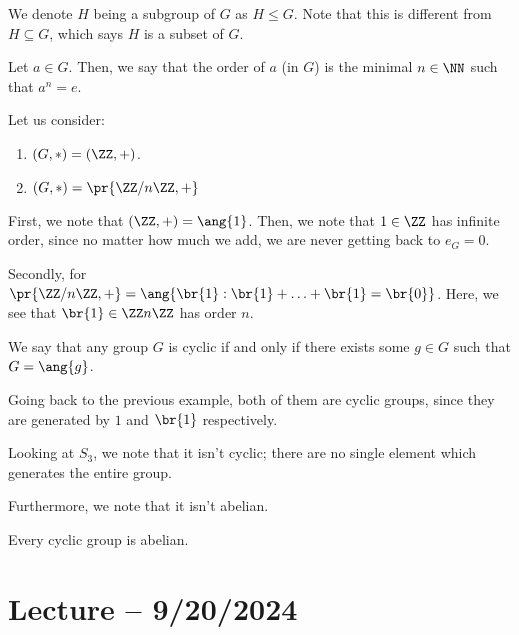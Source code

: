 \documentclass[openany]{book}
\begin{document}
\begin{rmk}
	We denote $H$ being a subgroup of $G$ as $H \leq G$. Note that this is different from $H \subseteq G$, which says $H$ is a subset of $G$.
\end{rmk}

\begin{defn}[Order]
	Let $a \in G$. Then, we say that the order of $a$ (in $G$) is the minimal $n \in \NN$ such that $a^{n} = e$.
\end{defn}

\begin{example}
	Let us consider:
	\begin{enumerate}
		\item $(G, *) = (\ZZ, +)$.
		\item $(G, *) = \pr{\ZZ/n\ZZ, +}$
	\end{enumerate}

	First, we note that $(\ZZ, +) = \ang{1}$. Then, we note that $1 \in \ZZ$ has infinite order, since no matter how much we add, we are never getting back to $e_G = 0$.
	
	Secondly, for $\pr{\ZZ/n\ZZ, +} = \ang{\br{1} : \br{1} + \ldots + \br{1} = \br{0}}$. Here, we see that $\br{1} \in \ZZ n\ZZ$ has order $n$.
\end{example}

\begin{defn}
	We say that any group $G$ is cyclic if and only if there exists some $g \in G$ such that $G = \ang{g}$.
\end{defn}
\begin{example}
	Going back to the previous example, both of them are cyclic groups, since they are generated by $1$ and $\br{1}$ respectively.
\end{example}
\begin{example}
	Looking at $S_3$, we note that it isn't cyclic; there are no single element which generates the entire group.
	
	Furthermore, we note that it isn't abelian.
\end{example}

\begin{thm}
	Every cyclic group is abelian.
\end{thm}

\section{Lecture -- 9/20/2024}
\end{document}
